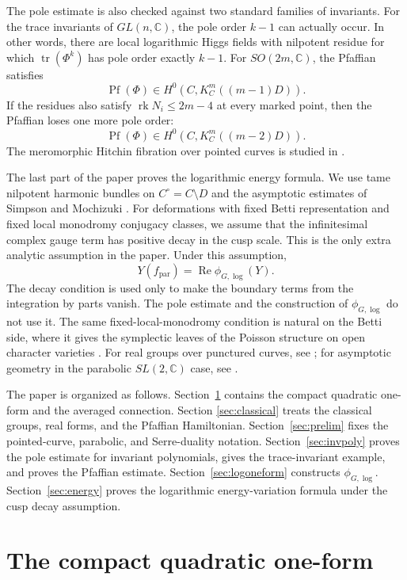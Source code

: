 \documentclass[11pt,reqno]{amsart}
\numberwithin{equation}{section}
\theoremstyle{plain}
\theoremstyle{definition}
\theoremstyle{remark}
\begin{document}
The pole estimate is also checked against two standard families of invariants.
For the trace invariants of \(GL(n,\mathbb C)\), the pole order \(k-1\) can
actually occur.  In other words, there are local logarithmic Higgs fields with
nilpotent residue for which \(\operatorname{tr}(\Phi^k)\) has pole order
exactly \(k-1\).  For \(SO(2m,\mathbb C)\), the Pfaffian satisfies
\[
        \operatorname{Pf}(\Phi)\in H^0(C,K_C^m((m-1)D)).
\]
If the residues also satisfy \(\operatorname{rk}N_i\leq 2m-4\) at every marked
point, then the Pfaffian loses one more pole order:
\[
        \operatorname{Pf}(\Phi)\in H^0(C,K_C^m((m-2)D)).
\]
The meromorphic Hitchin fibration over pointed curves is studied in
\cite{DonagiFernandezHerrero}.

The last part of the paper proves the logarithmic energy formula.  We use tame
nilpotent harmonic bundles on \(C^\circ=C\setminus D\) and the asymptotic
estimates of Simpson and Mochizuki
\cite{Simpson1990,MochizukiNilpotent}.  For deformations with fixed Betti
representation and fixed local monodromy conjugacy classes, we assume that the
infinitesimal complex gauge term has positive decay in the cusp scale.  This is
the only extra analytic assumption in the paper.  Under this assumption,
\[
        Y(f_{\mathrm{par}})
        =
        \operatorname{Re}\phi_{G,\log}(Y).
\]
The decay condition is used only to make the boundary terms from the
integration by parts vanish.  The pole estimate and the construction of
\(\phi_{G,\log}\) do not use it.  The same fixed-local-monodromy condition is
natural on the Betti side, where it gives the symplectic leaves of the Poisson
structure on open character varieties \cite{PantevToen}.  For real groups over
punctured curves, see \cite{BiquardGPM,GPLM}; for asymptotic geometry in the
parabolic \(SL(2,\mathbb C)\) case, see \cite{FMSW}.

The paper is organized as follows.  Section~\ref{sec:compact} contains the
compact quadratic one-form and the averaged connection.  Section
\ref{sec:classical} treats the classical groups, real forms, and the Pfaffian
Hamiltonian.  Section~\ref{sec:prelim} fixes the pointed-curve, parabolic, and
Serre-duality notation.  Section~\ref{sec:invpoly} proves the pole estimate for
invariant polynomials, gives the trace-invariant example, and proves the
Pfaffian estimate.  Section~\ref{sec:logoneform} constructs
\(\phi_{G,\log}\).  Section~\ref{sec:energy} proves the logarithmic
energy-variation formula under the cusp decay assumption.


\section{The compact quadratic one-form}
\label{sec:compact}
\end{document}
